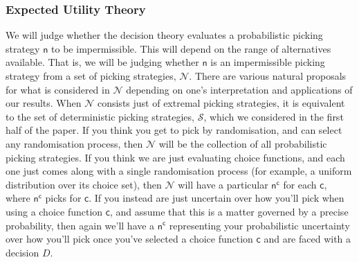 \documentclass[a4paper]{article}
\renewcommand\S{\mathcal{S}}
\renewcommand\c{\mathsf{c}} %
\newcommand{\n}{\mathsf{n}}
\newcommand\Nu{\mathcal{N}}
\newenvironment{CCM rewritten}
{\begingroup\color{blue}} %
{\endgroup}              %
\begin{document}
\subsubsection{Expected Utility Theory}
We will judge whether the decision theory evaluates a probabilistic picking strategy $\n$ to be impermissible. This will depend on the range of alternatives available. That is, we will be judging whether $\n$ is an impermissible picking strategy from a set of picking strategies, $\Nu$. 
There are various natural proposals for what is considered in $\Nu$ depending on one's interpretation and applications of our results. 
When $\Nu$ consists just of extremal picking strategies, it is equivalent to the set of deterministic picking strategies, $\S$, which we considered in the first half of the paper. 
If you think you get to pick by randomisation, and can select any randomisation process, then $\Nu$ will be the collection of all probabilistic picking strategies.
If you think we are just evaluating choice functions, and each one just comes along with a single randomisation process (for example, a uniform distribution over its choice set), %
then $\Nu$ will have a particular $\n^\c$ for each $\c$, where $\n^\c$ picks for $\c$. 
If you instead are just uncertain over how you'll pick when using a choice function $\c$, and assume that this is a matter governed by a precise probability, then again we'll have a $\n^\c$ representing your probabilistic uncertainty over how you'll pick once you've selected a choice function $\c$ and are faced with a decision $D$.
\end{document}

